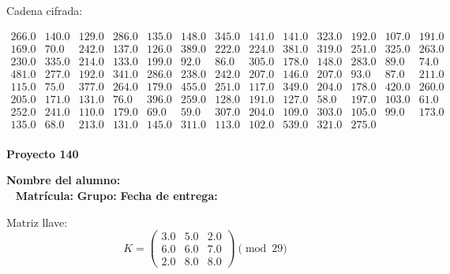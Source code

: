\documentclass[12pt]{article}
\begin{document}
Cadena cifrada:
\begin{center}
$\begin{array}{lllllllllllll}
266.0 & 140.0 & 129.0 & 286.0 & 135.0 & 148.0 & 345.0 & 141.0 & 141.0 & 323.0 & 192.0 & 107.0 & 191.0\\
169.0 & 70.0 & 242.0 & 137.0 & 126.0 & 389.0 & 222.0 & 224.0 & 381.0 & 319.0 & 251.0 & 325.0 & 263.0\\
230.0 & 335.0 & 214.0 & 133.0 & 199.0 & 92.0 & 86.0 & 305.0 & 178.0 & 148.0 & 283.0 & 89.0 & 74.0\\
481.0 & 277.0 & 192.0 & 341.0 & 286.0 & 238.0 & 242.0 & 207.0 & 146.0 & 207.0 & 93.0 & 87.0 & 211.0\\
115.0 & 75.0 & 377.0 & 264.0 & 179.0 & 455.0 & 251.0 & 117.0 & 349.0 & 204.0 & 178.0 & 420.0 & 260.0\\
205.0 & 171.0 & 131.0 & 76.0 & 396.0 & 259.0 & 128.0 & 191.0 & 127.0 & 58.0 & 197.0 & 103.0 & 61.0\\
252.0 & 241.0 & 110.0 & 179.0 & 69.0 & 59.0 & 307.0 & 204.0 & 109.0 & 303.0 & 105.0 & 99.0 & 173.0\\
135.0 & 68.0 & 213.0 & 131.0 & 145.0 & 311.0 & 113.0 & 102.0 & 539.0 & 321.0 & 275.0\\
\end{array}$
\end{center}

\newpage


\textbf{Proyecto 140}

\textbf{Nombre del alumno:} \underline{\hspace{13cm}}\\\
\vspace{1cm}
\textbf{Matrícula:} \underline{\hspace{4cm}} \hspace{1cm}
\textbf{Grupo:} \underline{\hspace{2cm}}
\textbf{Fecha de entrega:} \underline{\hspace{2cm}}

\medskip

Matriz llave:
\[
K = \begin{pmatrix}
3.0 & 5.0 & 2.0\\
6.0 & 6.0 & 7.0\\
2.0 & 8.0 & 8.0
\end{pmatrix} \pmod{29}
\]
\end{document}
